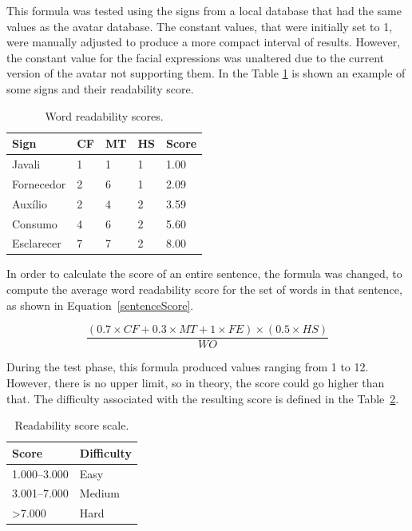 This formula was tested using the signs from a local database that had the same values as the avatar database.
The constant values, that were initially set to 1, were manually adjusted to produce a more compact interval of results.
However, the constant value for the facial expressions was unaltered due to the current version of the avatar not supporting them.
In the Table \ref{table:signs} is shown an example of some signs and their readability score.

\begin{table}[H]
    \centering
    \caption{Word readability scores.}
    \label{table:signs}
    \begin{tabular}{l|l|l|l|l}
        {\bfseries Sign} & {\bfseries CF} & {\bfseries MT} & {\bfseries HS} & {\bfseries Score} \\
        \hline
        Javali & 1 & 1 & 1 & 1.00  \\
        \hline
        Fornecedor & 2 & 6 & 1 & 2.09  \\
        \hline
        Auxílio & 2 & 4 & 2 & 3.59 \\
        \hline
        Consumo & 4 & 6 & 2 & 5.60 \\
        \hline
        Esclarecer & 7 & 7 & 2 & 8.00 \\
    \end{tabular}
\end{table}

In order to calculate the score of an entire sentence, the formula was changed, to compute the average word readability score for the set of words in that sentence, as shown in Equation~\ref{sentenceScore}.

\begin{equation}
    \frac{(0.7 \times CF + 0.3 \times MT + 1 \times FE) \times (0.5 \times HS)}{WO}
\label{sentenceScore}
\end{equation}

During the test phase, this formula produced values ranging from 1 to 12.
However, there is no upper limit, so in theory, the score could go higher than that.
The difficulty associated with the resulting score is defined in the Table~\ref{table:readabilityScale}.

\begin{table}[H]
    \centering
    \caption{Readability score scale.}
    \label{table:readabilityScale}
    \begin{tabular}{m{3cm}|m{3cm}}
        {\bfseries Score} & {\bfseries Difficulty} \\
        \hline
        1.000--3.000 & Easy\\
        \hline
        3.001--7.000 & Medium  \\
        \hline
        >7.000 & Hard \\
        \hline
    \end{tabular}
\end{table}


